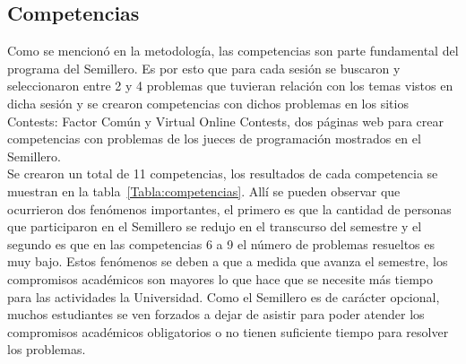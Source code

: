 \documentclass[conference]{IEEEtran}
\begin{document}
\subsection{Competencias}
Como se mencionó en la metodología, las competencias son parte fundamental del programa del Semillero. Es por esto que para cada sesión se buscaron y seleccionaron entre 2 y 4 problemas que tuvieran relación con los temas vistos en dicha sesión y se crearon competencias con dichos problemas en los sitios Contests: Factor Común\cite{FactorComun} y Virtual Online Contests\cite{AhmedAly}, dos páginas web para crear competencias con problemas de los jueces de programación mostrados en el Semillero.\\
Se crearon un total de 11 competencias, los resultados de cada competencia se muestran en la tabla~\ref{Tabla:competencias}. Allí se pueden observar que ocurrieron dos fenómenos importantes, el primero es que la cantidad de personas que participaron en el Semillero se redujo en el transcurso del semestre y el segundo es que en las competencias 6 a 9 el número de problemas resueltos es muy bajo. Estos fenómenos se deben a que a medida que avanza el semestre, los compromisos académicos son mayores lo que hace que se necesite más tiempo para las actividades la Universidad. Como el Semillero es de carácter opcional, muchos estudiantes se ven forzados a dejar de asistir para poder atender los compromisos académicos obligatorios o no tienen suficiente tiempo para resolver los problemas.
\end{document}
